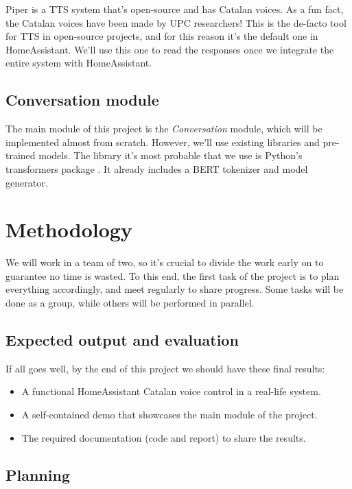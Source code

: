 \documentclass{article}
\begin{document}
Piper \cite{pipertts} is a TTS system that's open-source and has Catalan voices. As a fun fact, the Catalan voices have been made by UPC researchers! This is the de-facto tool for TTS in open-source projects, and for this reason it's the default one in HomeAssistant. We'll use this one to read the responses once we integrate the entire system with HomeAssistant.

\subsection{Conversation module}

The main module of this project is the \textit{Conversation} module, which will be implemented almost from scratch. However, we'll use existing libraries and pre-trained models. The library it's most probable that we use is Python's transformers package \cite{wolf-etal-2020-transformers}. It already includes a BERT tokenizer and model generator.

\section{Methodology}

We will work in a team of two, so it's crucial to divide the work early on to guarantee no time is wasted. To this end, the first task of the project is to plan everything accordingly, and meet regularly to share progress. Some tasks will be done as a group, while others will be performed in parallel.

\subsection{Expected output and evaluation}

If all goes well, by the end of this project we should have these final results:
\begin{itemize}
    \item A functional HomeAssistant Catalan voice control in a real-life system.
    \item A self-contained demo that showcases the main module of the project.
    \item The required documentation (code and report) to share the results.
\end{itemize}

\subsection{Planning}
\end{document}
